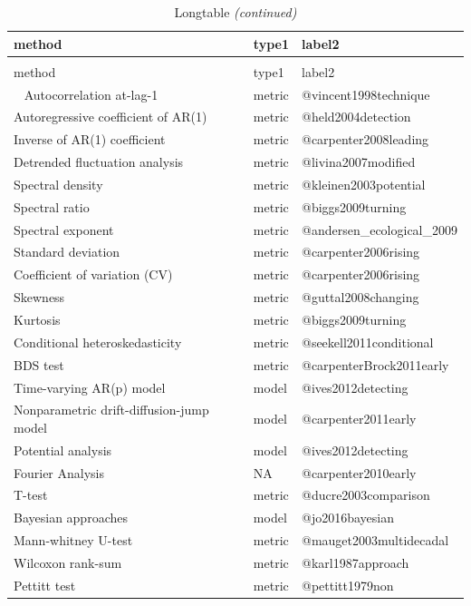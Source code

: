 \documentclass[12pt,twoside,openany]{reedthesis}
\begin{document}
\begin{longtable}{lll}
\caption{\label{tab:methodsMetricsListTab1}Longtable}\\
\toprule
method & type1 & label2\\
\midrule
\endfirsthead
\caption[]{\label{tab:methodsMetricsListTab1}Longtable \textit{(continued)}}\\
\toprule
method & type1 & label2\\
\midrule
\endhead
\
\endfoot
\bottomrule
\endlastfoot
Autocorrelation at-lag-1 & metric & @vincent1998technique\\
Autoregressive coefficient of AR(1) & metric & @held2004detection\\
Inverse of AR(1) coefficient & metric & @carpenter2008leading\\
Detrended fluctuation analysis & metric & @livina2007modified\\
Spectral density & metric & @kleinen2003potential\\
\addlinespace
Spectral ratio & metric & @biggs2009turning\\
Spectral exponent & metric & @andersen\_ecological\_2009\\
Standard deviation & metric & @carpenter2006rising\\
Coefficient of variation (CV) & metric & @carpenter2006rising\\
Skewness & metric & @guttal2008changing\\
\addlinespace
Kurtosis & metric & @biggs2009turning\\
Conditional heteroskedasticity & metric & @seekell2011conditional\\
BDS test & metric & @carpenterBrock2011early\\
Time-varying AR(p) model & model & @ives2012detecting\\
Nonparametric drift-diffusion-jump model & model & @carpenter2011early\\
\addlinespace
Potential analysis & model & @ives2012detecting\\
Fourier Analysis & NA & @carpenter2010early\\
T-test & metric & @ducre2003comparison\\
Bayesian approaches & model & @jo2016bayesian\\
Mann-whitney U-test & metric & @mauget2003multidecadal\\
\addlinespace
Wilcoxon rank-sum & metric & @karl1987approach\\
Pettitt test & metric & @pettitt1979non\\

\end{longtable}
\end{document}
